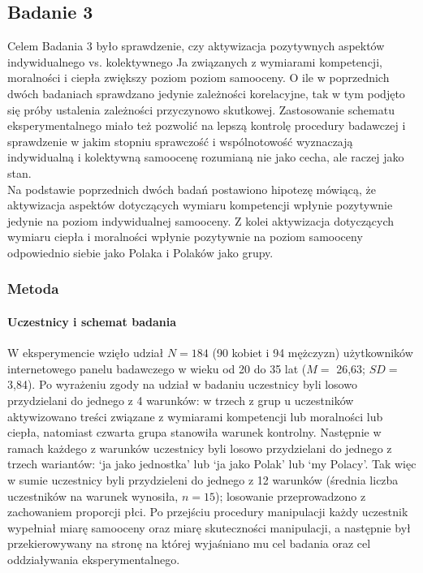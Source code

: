 \documentclass[man]{apa6}
\begin{document}
\subsection{Badanie 3}
Celem Badania 3 było sprawdzenie, czy aktywizacja pozytywnych aspektów indywidualnego vs. kolektywnego Ja związanych z wymiarami kompetencji, moralności i ciepła zwiększy poziom poziom samooceny. O ile w poprzednich dwóch badaniach sprawdzano jedynie zależności korelacyjne, tak w tym podjęto się próby ustalenia zależności przyczynowo skutkowej. Zastosowanie schematu eksperymentalnego miało też pozwolić na lepszą kontrolę procedury badawczej i sprawdzenie w jakim stopniu sprawczość i wspólnotowość wyznaczają indywidualną i kolektywną samoocenę rozumianą nie jako cecha, ale raczej jako stan.\\
Na podstawie poprzednich dwóch badań postawiono hipotezę mówiącą, że aktywizacja aspektów dotyczących wymiaru kompetencji wpłynie pozytywnie jedynie na poziom indywidualnej samooceny. Z kolei aktywizacja dotyczących wymiaru ciepła i moralności wpłynie pozytywnie na poziom samooceny odpowiednio siebie jako Polaka i Polaków jako grupy. \\

\subsubsection{Metoda}

\paragraph{Uczestnicy i schemat badania}
W eksperymencie wzięło udział $N = 184$ (90 kobiet i 94 mężczyzn) użytkowników internetowego panelu badawczego w wieku od 20 do 35 lat ($M =$ 26,63; $SD =$ 3,84). Po wyrażeniu zgody na udział w badaniu uczestnicy byli losowo przydzielani do jednego z 4 warunków: w trzech z grup u uczestników aktywizowano treści związane z wymiarami kompetencji lub moralności lub ciepła, natomiast czwarta grupa stanowiła warunek kontrolny. Następnie w ramach każdego z warunków uczestnicy byli losowo przydzielani do jednego z trzech wariantów: `ja jako jednostka' lub `ja jako Polak' lub `my Polacy'. Tak więc w sumie uczestnicy byli przydzieleni do jednego z 12 warunków (średnia liczba uczestników na warunek wynosiła, $n = 15$); losowanie przeprowadzono z zachowaniem proporcji płci. Po przejściu procedury manipulacji każdy uczestnik wypełniał miarę samooceny oraz miarę skuteczności manipulacji, a następnie był przekierowywany na stronę na której wyjaśniano mu cel badania oraz cel oddziaływania eksperymentalnego.
\end{document}
